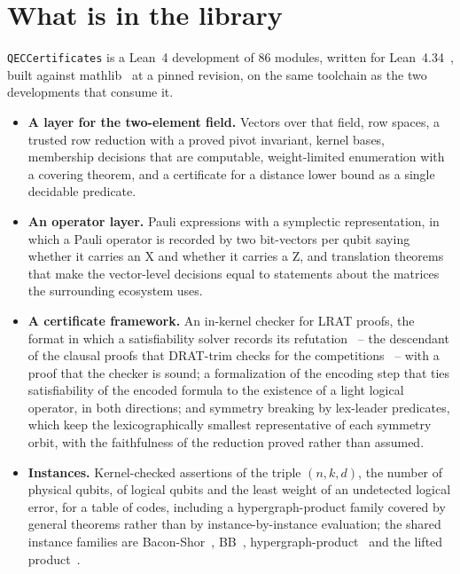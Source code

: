 \documentclass[11pt]{article}
\newcommand{\package}[1]{\texttt{#1}}
\begin{document}
\section{What is in the library}

\package{QECCertificates} is a Lean~4 development of 86 modules, written for
Lean~4.34~\cite{lean4}, built against mathlib~\cite{mathlib} at a pinned revision, on the
same toolchain as the two developments that consume it.

\begin{itemize}
\item \textbf{A layer for the two-element field.} Vectors over that field, row spaces, a trusted
row reduction with a proved pivot invariant, kernel bases, membership decisions that are
computable, weight-limited enumeration with a covering theorem, and a certificate for a
distance lower bound as a single decidable predicate.
\item \textbf{An operator layer.} Pauli expressions with a symplectic representation, in
which a Pauli operator is recorded by two bit-vectors per qubit saying whether it carries
an X and whether it carries a Z, and translation theorems that make the vector-level
decisions equal to statements about the matrices the surrounding ecosystem uses.
\item \textbf{A certificate framework.} An in-kernel checker for LRAT proofs, the format
in which a satisfiability solver records its refutation~\cite{cade2017} -- the descendant
of the clausal proofs that DRAT-trim checks for the competitions~\cite{wetzler2014} --
with a proof that
the checker is sound; a formalization of the encoding step that ties satisfiability of the
encoded formula to the existence of a light logical operator, in both directions; and
symmetry breaking by lex-leader predicates, which keep the lexicographically smallest
representative of each symmetry orbit, with the faithfulness of the reduction proved
rather than assumed.
\item \textbf{Instances.} Kernel-checked assertions of the triple $(n,k,d)$, the number
of physical qubits, of logical qubits and the least weight of an undetected logical error,
for a table of codes, including a hypergraph-product family covered by general theorems
rather than by instance-by-instance evaluation; the shared instance families are
Bacon-Shor~\cite{bacon2006}, BB~\cite{bravyi2024}, hypergraph-product~\cite{tillichzemor}
and the lifted product~\cite{panteleev2022}.
\end{itemize}
\end{document}
